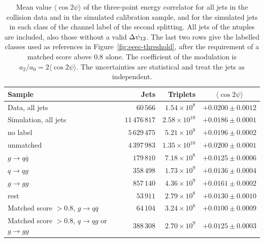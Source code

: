\begin{table}[htbp]
    \centering
    \caption{Mean value $\langle \cos 2\psi \rangle$ of the three-point energy
    correlator for all jets in the collision data and in the simulated calibration
    sample, and for the simulated jets in each class of the channel label of the
    second splitting. All jets of the ntuples are included, also those without a
    valid $\Delta\psi_{12}$. The last two rows give the labelled classes used as references in
    Figure~\ref{fig:eeec-threshold}, after the requirement of a matched score above
    $0.8$ alone. The coefficient of the modulation is
    $a_2/a_0 = 2\langle \cos 2\psi \rangle$. The uncertainties are statistical and
    treat the jets as independent.}
    \label{tab:eeec-classes}
    \begin{tabular}{lrrc}
      \toprule
      Sample & Jets & Triplets & $\langle \cos 2\psi \rangle$ \\
      \midrule
      Data, all jets & $60\,566$ & $1.54 \times 10^{8}$ & $+0.0200 \pm 0.0012$ \\
      \midrule
      Simulation, all jets & $11\,476\,817$ & $2.58 \times 10^{10}$ & $+0.0186 \pm 0.0001$ \\
      \quad no label & $5\,629\,475$ & $5.21 \times 10^{9}$ & $+0.0196 \pm 0.0002$ \\
      \quad unmatched & $4\,397\,983$ & $1.35 \times 10^{10}$ & $+0.0200 \pm 0.0001$ \\
      \quad $g \to q\bar{q}$ & $179\,810$ & $7.18 \times 10^{8}$ & $+0.0125 \pm 0.0006$ \\
      \quad $q \to qg$ & $358\,498$ & $1.73 \times 10^{9}$ & $+0.0136 \pm 0.0004$ \\
      \quad $g \to gg$ & $857\,140$ & $4.36 \times 10^{9}$ & $+0.0161 \pm 0.0002$ \\
      \quad rest & $53\,911$ & $2.79 \times 10^{8}$ & $+0.0130 \pm 0.0010$ \\
      \midrule
      Matched score $> 0.8$, $g \to q\bar{q}$ & $64\,104$ & $3.24 \times 10^{8}$ & $+0.0100 \pm 0.0009$ \\
      Matched score $> 0.8$, $q \to qg$ or $g \to gg$ & $388\,308$ & $2.70 \times 10^{9}$ & $+0.0125 \pm 0.0003$ \\
      \bottomrule
    \end{tabular}
  \end{table}
  
